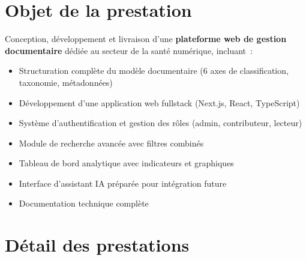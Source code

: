 \documentclass[12pt, a4paper]{article}
\begin{document}
\vspace{1cm}

\section{Objet de la prestation}

Conception, d\'eveloppement et livraison d'une \textbf{plateforme web de gestion documentaire} d\'edi\'ee au secteur de la sant\'e num\'erique, incluant~:

\begin{itemize}[leftmargin=1.5em]
  \item Structuration compl\`ete du mod\`ele documentaire (6 axes de classification, taxonomie, m\'etadonn\'ees)
  \item D\'eveloppement d'une application web fullstack (Next.js, React, TypeScript)
  \item Syst\`eme d'authentification et gestion des r\^oles (admin, contributeur, lecteur)
  \item Module de recherche avanc\'ee avec filtres combin\'es
  \item Tableau de bord analytique avec indicateurs et graphiques
  \item Interface d'assistant IA pr\'epar\'ee pour int\'egration future
  \item Documentation technique compl\`ete
\end{itemize}

\section{D\'etail des prestations}
\end{document}
